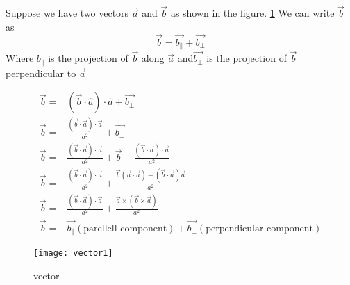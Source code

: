 \begin{note}

Suppose we have two vectors $ \vec{a}$ and $ \vec {b}$ as shown in the figure.
\ref{vector}
We can write $\vec{b}$ as
$$\vec{b}=\vec{{b_{\parallel}}}+\vec{{b_{\perp}}} $$
Where ${b_{\parallel}}$ is the projection of $ \vec {b}$ along  $ \vec{a}$ and$ \vec{{b_{\perp}}}$ is the projection of  $ \vec {b}$ perpendicular to $ \vec{a}$\\
\begin{minipage}{0.65\textwidth}
	\begin{align*}
	\vec {b}=&(\vec{b}\cdot \hat{a})\cdot \hat{a}+\vec{{b_{\perp}}}\\
	\vec {b}=&\frac{(\vec{b}\cdot \vec{a})\cdot\vec{a}}{a^{2}}+\vec{{b_{\perp}}}\\
	\vec {b}=&\frac{(\vec{b}\cdot \vec{a})\cdot\vec{a}}{a^{2}}+{\vec{b}-\frac{(\vec{b}\cdot \vec{a})\cdot\vec{a}}{a^{2}}}\\
	\vec {b}=&\frac{(\vec{b}\cdot \vec{a})\cdot\vec{a}}{a^{2}}+\frac{\vec{b}(\vec{a}\cdot\vec{a})-{(\vec{b}\cdot\vec{a})\vec{a}}}{a^{2}}\\
	\vec {b}=&\frac{(\vec{b}\cdot \vec{a})\cdot\vec{a}}{a^{2}}+\frac{\vec{a}\times(\vec{b}\times\vec{a})}{a^{2}}\\
	\vec{b}=&\vec{{b_{\parallel}}}(\text{parellell component})+\vec{{b_{\perp}}}(\text{perpendicular component})
	\end{align*}
\end{minipage}
\begin{minipage}{0.35\textwidth}\hfill
\begin{figure}[H]
	\begin{center}
		\texttt{[image: vector1]}
	\end{center}
\caption{vector}
\label{vector}
\end{figure}
\end{minipage}
\end{note}

